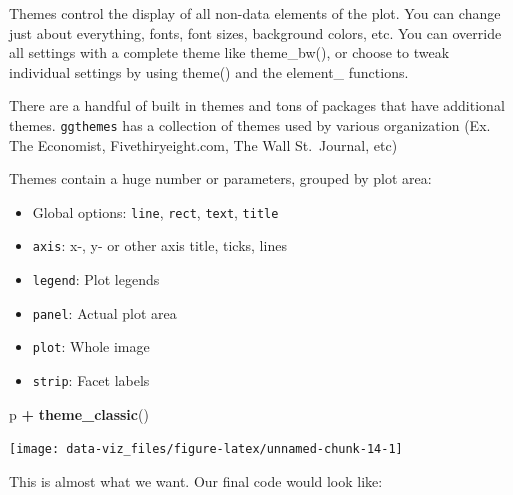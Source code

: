 \documentclass[]{book}
\newenvironment{Shaded}{\begin{snugshade}}{\end{snugshade}}
\newcommand{\KeywordTok}[1]{\textcolor[rgb]{0.13,0.29,0.53}{\textbf{#1}}}
\newcommand{\StringTok}[1]{\textcolor[rgb]{0.31,0.60,0.02}{#1}}
\newcommand{\OperatorTok}[1]{\textcolor[rgb]{0.81,0.36,0.00}{\textbf{#1}}}
\newcommand{\NormalTok}[1]{#1}
\providecommand{\tightlist}{%
  \setlength{\itemsep}{0pt}\setlength{\parskip}{0pt}}
\theoremstyle{definition}
\theoremstyle{definition}
\theoremstyle{definition}
\theoremstyle{remark}
\begin{document}
Themes control the display of all non-data elements of the plot. You can
change just about everything, fonts, font sizes, background colors, etc.
You can override all settings with a complete theme like theme\_bw(), or
choose to tweak individual settings by using theme() and the element\_
functions.

There are a handful of built in themes and tons of packages that have
additional themes. \texttt{ggthemes} has a collection of themes used by
various organization (Ex. The Economist, Fivethiryeight.com, The Wall
St.~Journal, etc)

Themes contain a huge number or parameters, grouped by plot area:

\begin{itemize}
\tightlist
\item
  Global options: \texttt{line}, \texttt{rect}, \texttt{text},
  \texttt{title}
\item
  \texttt{axis}: x-, y- or other axis title, ticks, lines
\item
  \texttt{legend}: Plot legends
\item
  \texttt{panel}: Actual plot area
\item
  \texttt{plot}: Whole image
\item
  \texttt{strip}: Facet labels
\end{itemize}

\begin{Shaded}
\begin{Highlighting}[]
\NormalTok{p }\OperatorTok{+}\StringTok{ }\KeywordTok{theme_classic}\NormalTok{()}
\end{Highlighting}
\end{Shaded}

\begin{center}\texttt{[image: data-viz\_files/figure-latex/unnamed-chunk-14-1]} \end{center}

This is almost what we want. Our final code would look like:
\end{document}
